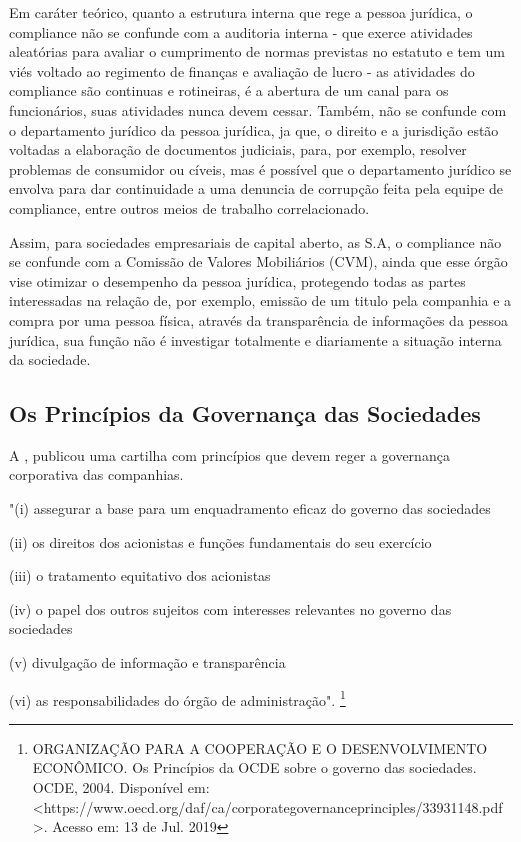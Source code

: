 Em caráter teórico, quanto a estrutura interna que rege a pessoa jurídica, o compliance não se confunde com a auditoria interna - que exerce atividades aleatórias para avaliar o cumprimento de normas previstas no estatuto e tem um viés voltado ao regimento de finanças e avaliação de lucro - as atividades do compliance são continuas e rotineiras, é a abertura de um canal para os funcionários, suas atividades nunca devem cessar. Também, não se confunde com o departamento jurídico da pessoa jurídica, ja que, o direito e a jurisdição estão voltadas a elaboração de documentos judiciais, para, por exemplo, resolver problemas de consumidor ou cíveis, mas é possível que o departamento jurídico se envolva para dar continuidade a uma denuncia de corrupção feita pela equipe de compliance, entre outros meios de trabalho correlacionado. 

Assim, para sociedades empresariais de capital aberto, as S.A, o compliance não se confunde com a Comissão de Valores Mobiliários (CVM), ainda que esse órgão vise otimizar o desempenho da pessoa jurídica, protegendo todas as partes interessadas na relação de, por exemplo, emissão de um titulo pela companhia e a compra por uma pessoa física, através da transparência de informações da pessoa jurídica, sua função não é investigar totalmente e diariamente a situação interna da sociedade. 

\subsection*{Os Princípios da Governança das Sociedades}

A \cite{ocdeprincipios}, publicou uma cartilha com princípios que devem reger a governança corporativa das companhias. 

"(i) assegurar a base para um enquadramento eficaz do governo das sociedades 

(ii) os direitos dos acionistas e funções fundamentais do seu exercício

(iii) o tratamento equitativo dos acionistas

(iv) o papel dos outros sujeitos com interesses relevantes no governo
das sociedades

(v) divulgação de informação e transparência

(vi) as responsabilidades do órgão de administração". \footnote{ORGANIZAÇÃO PARA A COOPERAÇÃO E O DESENVOLVIMENTO ECONÔMICO. Os Princípios da OCDE sobre o governo das sociedades. OCDE, 2004. Disponível em: <https://www.oecd.org/daf/ca/corporategovernanceprinciples/33931148.pdf>. Acesso em: 13 de Jul. 2019}

